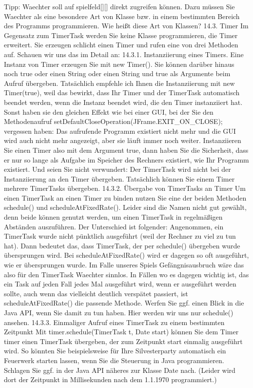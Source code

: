 Tipp: Waechter soll auf spielfeld[][] direkt zugreifen können. Dazu müssen Sie Waechter als eine besondere Art von Klasse bzw. in einem bestimmten Bereich des Programms programmieren. Wie heißt diese Art von Klassen?
14.3.	Timer
Im Gegensatz zum TimerTask werden Sie keine Klasse programmieren, die Timer erweitert. Sie erzeugen schlicht einen Timer und rufen eine von drei Methoden auf. Schauen wir uns das im Detail an:
14.3.1.	Instanziierung eines Timers.
Eine Instanz von Timer erzeugen Sie mit new Timer(). Sie können darüber hinaus noch true oder einen String oder einen String und true als Argumente beim Aufruf übergeben. Tatsächlich empfehle ich Ihnen die Instanziierung mit new Timer(true), weil das bewirkt, dass Ihr Timer und der TimerTask automatisch beendet werden, wenn die Instanz beendet wird, die den Timer instanziiert hat. Sonst haben sie den gleichen Effekt wie bei einer GUI, bei der Sie den Methodenaufruf setDefaultCloseOperation(JFrame.EXIT_ON_CLOSE); vergessen haben: Das aufrufende Programm existiert nicht mehr und die GUI wird auch nicht mehr angezeigt, aber sie läuft immer noch weiter. Instanziieren Sie einen Timer also mit dem Argument true, dann haben Sie die Sicherheit, dass er nur so lange als Aufgabe im Speicher des Rechners existiert, wie Ihr Programm existiert.
Und seien Sie nicht verwundert: Der TimerTask wird nicht bei der Instanziierung an den Timer übergeben. Tatsächlich können Sie einem Timer mehrere TimerTasks übergeben.
14.3.2.	Übergabe von TimerTasks an Timer
Um einen TimerTask an einen Timer zu binden nutzen Sie eine der beiden Methoden schedule() und scheduleAtFixedRate(). Leider sind die Namen nicht gut gewählt, denn beide können genutzt werden, um einen TimerTask in regelmäßigen Abständen auszuführen. Der Unterschied ist folgender: Angenommen, ein TimerTask wurde nicht pünktlich ausgeführt (weil der Rechner zu viel zu tun hat). Dann bedeutet das, dass TimerTask, der per schedule() übergeben wurde übersprungen wird. Bei scheduleAtFixedRate() wird er dagegen so oft ausgeführt, wie er übersprungen wurde. Im Falle unseres Spiels Gefängnisausbruch wäre das also für den TimerTask Waechter sinnlos. In Fällen wo es dagegen wichtig ist, das ein Task auf jeden Fall jedes Mal ausgeführt wird, wenn er ausgeführt werden sollte, auch wenn das vielleicht deutlich verspätet passiert, ist scheduleAtFixedRate() die passende Methode. Werfen Sie ggf. einen Blick in die Java API, wenn Sie damit zu tun haben. Hier werden wir uns nur schedule() ansehen.
14.3.3.	Einmaliger Aufruf eines TimerTask zu einem bestimmten Zeitpunkt
Mit timer.schedule(TimerTask t, Date start) können Sie dem Timer timer einen TimerTask übergeben, der zum Zeitpunkt start einmalig ausgeführt wird. So könnten Sie beispielsweise für Ihre Silvesterparty automatisch ein Feuerwerk starten lassen, wenn Sie die Steuerung in Java programmieren. Schlagen Sie ggf. in der Java API näheres zur Klasse Date nach. (Leider wird dort der Zeitpunkt in Millisekunden nach dem 1.1.1970 programmiert.)
